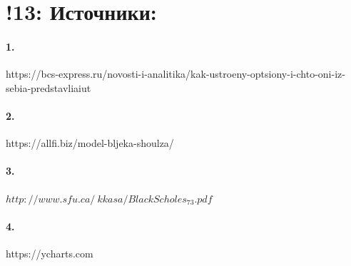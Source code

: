 \documentclass[a4paper]{article}
\begin{document}
\section*{!13: Источники:}
\paragraph*{1.}
https://bcs-express.ru/novosti-i-analitika/kak-ustroeny-optsiony-i-chto-oni-iz-sebia-predstavliaiut
\paragraph*{2.}
https://allfi.biz/model-bljeka-shoulza/
\paragraph*{3.}
$http://www.sfu.ca/~kkasa/BlackScholes_73.pdf$
\paragraph*{4.}
https://ycharts.com
\end{document}

